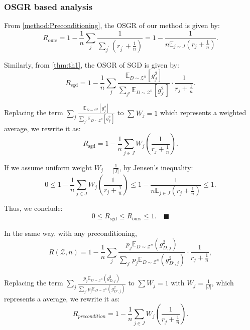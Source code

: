\documentclass{article}
\theoremstyle{plain}
\theoremstyle{definition}
\theoremstyle{remark}
\begin{document}
\subsubsection{OSGR based analysis}
From \cref{method:Preconditioning}, the OSGR of our method is given by:
\begin{equation}
R_{\text{ours}} = 1 - \frac{1}{n} \sum_{j} \frac{1}{\sum_{j^\prime} \left(r_{j^\prime}+\frac{1}{n}\right)}
= 1 - \frac{1}{n\mathbb{E}_{j \sim J} \left(r_{j}+\frac{1}{n}\right)}.
\end{equation}

Similarly, from \cref{thm:th1}, the OSGR of SGD is given by:
\begin{equation}
R_{\text{sgd}} = 1 - \frac{1}{n} \sum_{j} \frac{\mathbb{E}_{D\sim\mathcal{Z}^n}[g_j^2]}{\sum_{j'}\mathbb{E}_{D\sim\mathcal{Z}^n}[g_{j'}^2]} \cdot \frac{1}{r_j+ \frac{1}{n}}.
\end{equation}

Replacing the term $\sum_{j} \frac{\mathbb{E}_{D\sim\mathcal{Z}^n}[g_j^2]}{\sum_{j'}\mathbb{E}_{D\sim\mathcal{Z}^n}[g_{j'}^2]}$ to $\sum W_j = 1$ which represents a weighted average, we rewrite it as:
\begin{equation}
R_{\text{sgd}} = 1 - \frac{1}{n} \sum_{j \in J} W_j \left(\frac{1}{r_j+ \frac{1}{n}}\right).
\end{equation}

If we assume uniform weight $W_j= \frac{1}{|J|}$, by Jensen's inequality:
\begin{equation}
0 \leq 1 - \frac{1}{n} \sum_{j \in J} W_j \left(\frac{1}{r_j+ \frac{1}{n}}\right) 
\leq 1 - \frac{1}{n\mathbb{E}_{j \in J} \left(r_j+\frac{1}{n}\right)} \leq 1.
\end{equation}

Thus, we conclude:
\begin{equation}
0 \leq R_{\text{sgd}} \leq R_{\text{ours}} \leq 1.\quad\blacksquare
\end{equation}

In the same way, with any preconditioning, 
\begin{equation}
R(\mathcal{Z}, n) = 1 -  \frac{1}{n}\sum_j \frac{p_j\mathbb{E}_{D \sim \mathcal{Z}^n}(g_{D,j}^2)}{\sum_{j'} p_j\mathbb{E}_{D \sim \mathcal{Z}^n}(g_{D',j}^2)} \cdot \frac{1}{ r_j + \frac{1}{n}},
\end{equation}

Replacing the term $\sum_j \frac{p_j\mathbb{E}_{D \sim \mathcal{Z}^n}(g_{D,j}^2)}{\sum_{j'} p_j\mathbb{E}_{D \sim \mathcal{Z}^n}(g_{D',j}^2)}$ to $\sum W_j = 1$ with $W_j= \frac{1}{|J|}$, which represents a average, we rewrite it as:
\begin{equation}
R_{precondition} = 1 - \frac{1}{n} \sum_{j \in J} W_j \left(\frac{1}{r_j+ \frac{1}{n}}\right).
\end{equation}
\end{document}
